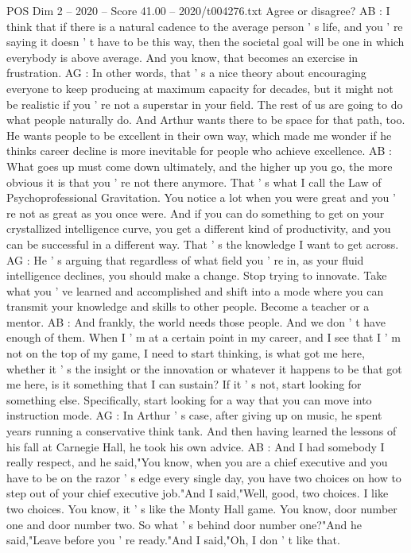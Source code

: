 \begin{textsample}{POS Dim 2 – 2020 – Score 41.00 – 2020/t004276.txt}
Agree or disagree?
AB : I think that if there is a natural cadence to the average person ' s life, and you ' re saying it doesn ' t have to be this way, then the societal goal will be one in which everybody is above average.
And you know, that becomes an exercise in frustration.
AG : In other words, that ' s a nice theory about encouraging everyone to keep producing at maximum capacity for decades, but it might not be realistic if you ' re not a superstar in your field.
The rest of us are going to do what people naturally do.
And Arthur wants there to be space for that path, too.
He wants people to be excellent in their own way, which made me wonder if he thinks career decline is more inevitable for people who achieve excellence.
AB : What goes up must come down ultimately, and the higher up you go, the more obvious it is that you ' re not there anymore.
That ' s what I call the Law of Psychoprofessional Gravitation.
You notice a lot when you were great and you ' re not as great as you once were.
And if you can do something to get on your crystallized intelligence curve, you get a different kind of productivity, and you can be successful in a different way.
That ' s the knowledge I want to get across.
AG : He ' s arguing that regardless of what field you ' re in, as your fluid intelligence declines, you should make a change.
Stop trying to innovate.
Take what you ' ve learned and accomplished and shift into a mode where you can transmit your knowledge and skills to other people.
Become a teacher or a mentor.
AB : And frankly, the world needs those people.
And we don ' t have enough of them.
When I ' m at a certain point in my career, and I see that I ' m not on the top of my game, I need to start thinking, is what got me here, whether it ' s the insight or the innovation or whatever it happens to be that got me here, is it something that I can sustain?
If it ' s not, start looking for something else.
Specifically, start looking for a way that you can move into instruction mode.
AG : In Arthur ' s case, after giving up on music, he spent years running a conservative think tank.
And then having learned the lessons of his fall at Carnegie Hall, he took his own advice.
AB : And I had somebody I really respect, and he said,"You know, when you are a chief executive and you have to be on the razor ' s edge every single day, you have two choices on how to step out of your chief executive job."And I said,"Well, good, two choices.
I like two choices.
You know, it ' s like the Monty Hall game.
You know, door number one and door number two.
So what ' s behind door number one?"And he said,"Leave before you ' re ready."And I said,"Oh, I don ' t like that.

\end{textsample}
